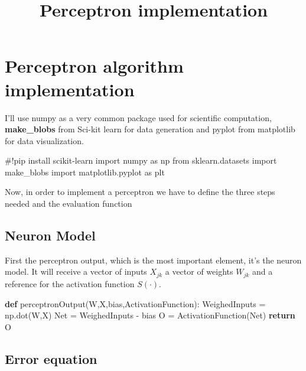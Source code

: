\documentclass[
]{IEEEtran}
\title{Perceptron implementation}
\author{}
\date{}
\newenvironment{Shaded}{\begin{snugshade}}{\end{snugshade}}
\newcommand{\CommentTok}[1]{\textcolor[rgb]{0.37,0.37,0.37}{#1}}
\newcommand{\ControlFlowTok}[1]{\textcolor[rgb]{0.00,0.23,0.31}{\textbf{#1}}}
\newcommand{\ImportTok}[1]{\textcolor[rgb]{0.00,0.46,0.62}{#1}}
\newcommand{\KeywordTok}[1]{\textcolor[rgb]{0.00,0.23,0.31}{\textbf{#1}}}
\newcommand{\NormalTok}[1]{\textcolor[rgb]{0.00,0.23,0.31}{#1}}
\newcommand{\OperatorTok}[1]{\textcolor[rgb]{0.37,0.37,0.37}{#1}}
\begin{document}
\maketitle


\section{Perceptron algorithm
implementation}\label{perceptron-algorithm-implementation}

I'll use numpy as a very common package used for scientific computation,
\textbf{make\_blobs} from Sci-kit learn for data generation and pyplot
from matplotlib for data visualization.

\begin{Shaded}
\begin{Highlighting}[]
\CommentTok{\#!pip install scikit{-}learn}
\ImportTok{import}\NormalTok{ numpy }\ImportTok{as}\NormalTok{ np}
\ImportTok{from}\NormalTok{ sklearn.datasets }\ImportTok{import}\NormalTok{ make\_blobs}
\ImportTok{import}\NormalTok{ matplotlib.pyplot }\ImportTok{as}\NormalTok{ plt}
\end{Highlighting}
\end{Shaded}

Now, in order to implement a perceptron we have to define the three
steps needed and the evaluation function

\subsection{Neuron Model}\label{neuron-model}

First the perceptron output, which is the most important element, it's
the neuron model. It will receive a vector of inputs \(X_{jk}\) a vector
of weights \(W_{jk}\) and a reference for the activation function
\(S(\cdot)\).

\begin{Shaded}
\begin{Highlighting}[]
\KeywordTok{def}\NormalTok{ perceptronOutput(W,X,bias,ActivationFunction):}
\NormalTok{  WeighedInputs }\OperatorTok{=}\NormalTok{ np.dot(W,X)}
\NormalTok{  Net }\OperatorTok{=}\NormalTok{ WeighedInputs }\OperatorTok{{-}}\NormalTok{ bias}
\NormalTok{  O }\OperatorTok{=}\NormalTok{ ActivationFunction(Net)}
  \ControlFlowTok{return}\NormalTok{ O}
\end{Highlighting}
\end{Shaded}

\subsection{Error equation}\label{error-equation}
\end{document}
